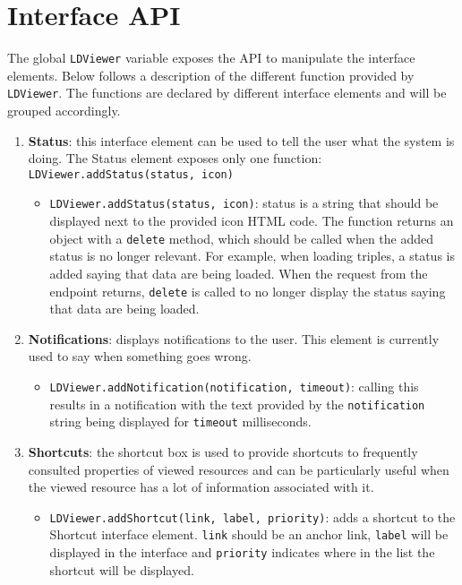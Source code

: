 \documentclass{book}
\begin{document}
\section{Interface API}
\label{sec:ldapi}
The global \texttt{LDViewer} variable exposes the API to manipulate the interface elements.
Below follows a description of the different function provided by \texttt{LDViewer}.
The functions are declared by different interface elements and will be grouped accordingly.
\begin{enumerate}
\item \textbf{Status}: this interface element can be used to tell the user what the system is doing.
The Status element exposes only one function: \texttt{LDViewer.addStatus(status, icon)}
\begin{itemize}
\item \texttt{LDViewer.addStatus(status, icon)}: status is a string that should be displayed next to the provided icon HTML code.
The function returns an object with a \texttt{delete} method, which should be called when the added status is no longer relevant.
For example, when loading triples, a status is added saying that data are being loaded.
When the request from the endpoint returns, \texttt{delete} is called to no longer display the status saying that data are being loaded.
\end{itemize}

\item \textbf{Notifications}: displays notifications to the user.
This element is currently used to say when something goes wrong.
\begin{itemize}
\item \texttt{LDViewer.addNotification(notification, timeout)}: calling this results in a notification with the text provided by the \texttt{notification} string being displayed for \texttt{timeout} milliseconds.
\end{itemize}

\item \textbf{Shortcuts}: the shortcut box is used to provide shortcuts to frequently consulted properties of viewed resources and can be particularly useful when the viewed resource has a lot of information associated with it.
\begin{itemize}
\item \texttt{LDViewer.addShortcut(link, label, priority)}: adds a shortcut to the Shortcut interface element. \texttt{link} should be an anchor link, \texttt{label} will be displayed in the interface and \texttt{priority} indicates where in the list the shortcut will be displayed.
\end{itemize}


\end{enumerate}
\end{document}
